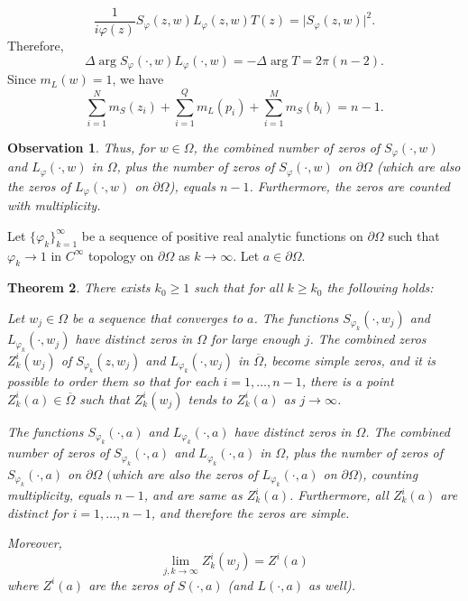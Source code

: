 \documentclass[11pt, reqno]{amsart}
\newtheorem{thm}{Theorem}[section]
\newtheorem{obs}[thm]{Observation}
\numberwithin{equation}{section}
\newcommand{\ov}{\overline}
\newcommand{\Om}{\Omega}
\begin{document}
	\[
	\frac{1}{i\varphi(z)}S_{\varphi}(z, w) L_{\varphi}(z,w) T(z)= \vert S_{\varphi}(z,w)\vert^2.
	\]
	Therefore, 
	\[
	\Delta \arg S_{\varphi}(\cdot,w)L_{\varphi}(\cdot,w) = - \Delta \arg T = 2\pi(n-2).
	\]
	Since $m_L(w) = 1$, we have
	\begin{equation}
	\sum_{i=1}^N m_S(z_i) + \sum_{i=1}^Q m_L(p_i) + \sum_{i=1}^M m_S(b_i) 
	=
	n-1.
	\end{equation}
	\begin{obs}
		Thus, for $w\in\Omega$, the combined number of zeros of $S_{\varphi}(\cdot, w)$ and $L_{\varphi}(\cdot, w)$ in $\Om$, plus the number of zeros of $S_{\varphi}(\cdot,w)$ on $\partial\Om$ (which are also the zeros of $L_{\varphi}(\cdot,w)$ on $\partial\Om$), equals $n-1$. Furthermore, the zeros are counted with multiplicity.
	\end{obs}
	
	\medskip
	
	Let $\{\varphi_k\}_{k=1}^{\infty}$ be a sequence of positive real analytic functions on $\partial\Omega$ such that $\varphi_k\rightarrow 1$ in $C^{\infty}$ topology on $\partial\Omega$ as $k\rightarrow\infty$. Let $a\in\partial\Omega$. 
	
	\begin{thm}	
		There exists $k_0 \ge 1$ such that for all $k\geq k_0$ the following holds: 
		
		\medskip
		
		Let $w_j\in\Om$ be a sequence that converges to $a$. The functions $S_{\varphi_k}(\cdot,w_j)$ and $L_{\varphi_k}(\cdot,w_j)$ have distinct zeros in $\Omega$ for large enough $j$. The combined zeros $Z^i_k(w_j)$ of $S_{\varphi_k}(z,w_j)$ and $L_{\varphi_k}(\cdot, w_j)$ in $\overline{\Omega}$, become simple zeros, and it is possible to order them so that for each $i=1,\ldots, n-1$, there is a point $Z_k^i(a)\in\ov{\Om}$ such that $Z^i_k(w_j)$ tends to $Z^i_k(a)$ as $j\rightarrow\infty$. 
		
		\medskip
		
		The functions $S_{\varphi_k}(\cdot,a)$ and $L_{\varphi_k}(\cdot,a)$ have distinct zeros in $\Omega$. The combined number of zeros of $S_{\varphi_k}(\cdot, a)$ and $L_{\varphi_k}(\cdot,a)$ in $\Om$, plus the number of zeros of  $S_{\varphi_k}(\cdot,a)$ on $\partial\Om$ $($which are also the zeros of $L_{\varphi_k}(\cdot,a)$ on $\partial\Om)$, counting multiplicity, equals $n-1$, and are same as $Z_{k}^i(a)$. Furthermore, all $Z_{k}^i(a)$ are distinct for $i=1,\ldots, n-1$, and therefore the zeros are simple.
		
		\medskip
		
		Moreover, 
		\[
		\lim_{j,k\rightarrow\infty} Z^i_{k}(w_j) = Z^i(a)
		\]
		where $Z^i(a)$ are the zeros of $S(\cdot,a)$ (and $L(\cdot,a)$ as well).
	\end{thm}
	
\end{document}
